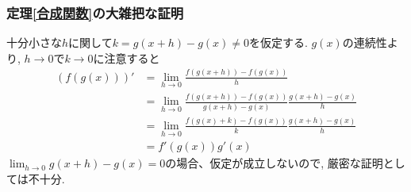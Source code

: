 

\begin{frame}
\frametitle{定理\ref{合成関数}の大雑把な証明}


十分小さな$h$に関して$k=g(x+h)- g(x)\ne 0$を仮定する. 
$g(x)$の連続性より, $h \to 0$で$k\to 0$に注意すると
\begin{align*} 
(f(g(x)))' &= \lim_{h\to 0}\frac{f(g(x+h))-f(g(x))}{h} \\
& =  \lim_{h\to 0}\frac{f(g(x+h))-f(g(x))}{g(x+h)-g(x)} \frac{g(x+h)-g(x)}{h} \\
& =  \lim_{h\to 0}\frac{f(g(x)+k)-f(g(x))}{k} \frac{g(x+h)-g(x)}{h} \\
& =f'(g(x))g'(x)
\end{align*}
$\lim_{h\to 0}g(x+h) - g(x) = 0$の場合、仮定が成立しないので, 厳密な証明としては不十分. 

\end{frame}




